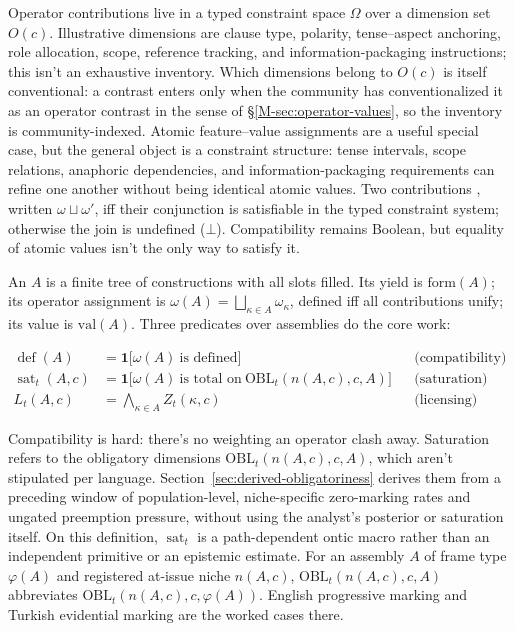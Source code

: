 Operator contributions live in a typed constraint space $\Omega$ over a
dimension set $O(c)$. Illustrative dimensions are clause type, polarity,
tense--aspect anchoring, role allocation, scope, reference tracking, and
information-packaging instructions; this isn't an exhaustive inventory. Which
dimensions belong to $O(c)$ is itself
conventional: a contrast enters only when the community has conventionalized it
as an operator contrast in the sense of \S\ref{M-sec:operator-values}, so the
inventory is community-indexed. Atomic feature--value assignments are a useful
special case, but the general object is a constraint structure: tense intervals,
scope relations, anaphoric dependencies, and information-packaging requirements
can refine one another without being identical atomic values. Two contributions
, written $\omega \sqcup \omega'$, iff their conjunction is
satisfiable in the typed constraint system; otherwise the join is undefined
($\bot$). Compatibility remains Boolean, but equality of atomic values isn't
the only way to satisfy it.

An  $A$ is a finite tree of constructions with all slots filled. Its yield is $\mathrm{form}(A)$; its operator assignment is $\omega(A)=\bigsqcup_{\kappa\in A}\omega_\kappa$, defined iff all contributions unify; its value is $\mathrm{val}(A)$. Three predicates over assemblies do the core work:

\begin{align}
\operatorname{def}(A) &= \mathbf{1}\bigl[\omega(A)\ \text{is defined}\bigr]
  && \text{(compatibility)} \\
\operatorname{sat}_t(A,c) &= \mathbf{1}\bigl[\omega(A)\ \text{is total on}\
  \mathrm{OBL}_t(n(A,c),c,A)\bigr]
  && \text{(saturation)} \\
L_t(A,c) &= \textstyle\bigwedge_{\kappa\in A} Z_t(\kappa,c)
  && \text{(licensing)}
\end{align}

Compatibility is hard: there's no weighting an operator clash away. Saturation
refers to the obligatory dimensions $\mathrm{OBL}_t(n(A,c),c,A)$, which aren't
stipulated per language. Section~\ref{sec:derived-obligatoriness} derives them
from a preceding window of population-level, niche-specific zero-marking rates
and ungated preemption pressure, without using the analyst's posterior or
saturation itself.
On this definition, $\operatorname{sat}_t$ is a path-dependent ontic macro rather than an
independent primitive or an epistemic estimate. For an assembly $A$ of frame
type $\varphi(A)$ and registered at-issue niche $n(A,c)$,
$\mathrm{OBL}_t(n(A,c),c,A)$ abbreviates
$\mathrm{OBL}_t(n(A,c),c,\varphi(A))$. English progressive marking and Turkish
evidential marking are the worked cases there.

